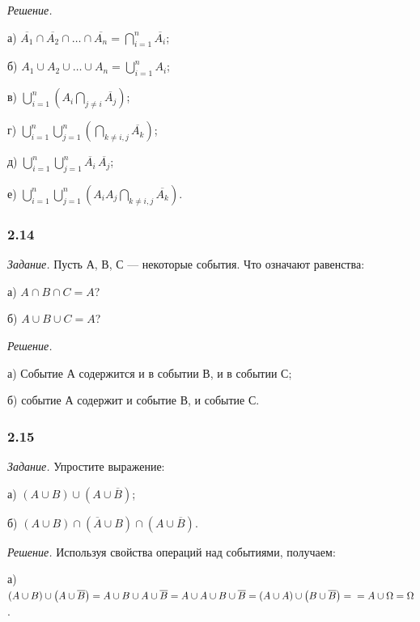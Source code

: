\documentclass{book}
\begin{document}
\textit{Решение.}

а) $ \overline{ A_1 } \cap \overline{ A_2 } \cap \dotsc \cap \overline{ A_n } =
\bigcap \limits_{ i = 1 }^n \overline{ A_i }$;

б) $ A_1 \cup A_2 \cup \dotsc \cup A_n =
\bigcup \limits_{ i = 1 }^n A_i $;

в) $ \bigcup \limits_{ i = 1 }^n \left( A_i \bigcap \limits_{ j \neq i } \overline{ A_j } \right) $;

г) $ \bigcup \limits_{ i = 1 }^n \bigcup \limits_{ j = 1 }^n \left( \bigcap \limits_{ k \neq i, j} \overline{ A_k } \right) $;

д) $ \bigcup \limits_{ i = 1 }^n \bigcup \limits_{ j = 1 }^n \overline{ A_i } \, \overline{ A_j } $;

е) $ \bigcup \limits_{ i = 1 }^n \bigcup \limits_{ j = 1 }^n \left( A_i A_j \bigcap \limits_{ k \neq i, j } \overline{ A_k } \right) $.

\subsubsection*{2.14}

\textit{Задание.} Пусть А, В, С --- некоторые события.
Что означают равенства:

а) $ A \cap B \cap C = A $?

б) $ A \cup B \cup C = A $?

\textit{Решение.}

а) Событие А содержится и в событии В, и в событии С;

б) событие А содержит и событие В, и событие С.

\subsubsection*{2.15}

\textit{Задание.} Упростите выражение:

а) $ \left( A \cup B \right) \cup \left( A \cup \overline{ B } \right) $;

б) $ \left( A \cup B \right) \cap \left( \overline{ A } \cup B \right) \cap \left( A \cup \overline{ B } \right) $.

\textit{Решение.} Используя свойства операций над событиями, получаем:

а) $ \left( A \cup B \right) \cup \left( A \cup \overline{ B } \right) =
A \cup B \cup A \cup \overline{ B } =
A \cup A \cup B \cup \overline{ B } =
\left( A \cup A \right) \cup \left( B \cup \overline{ B } \right) = \\
= A \cup \Omega =
\Omega $.
\end{document}
